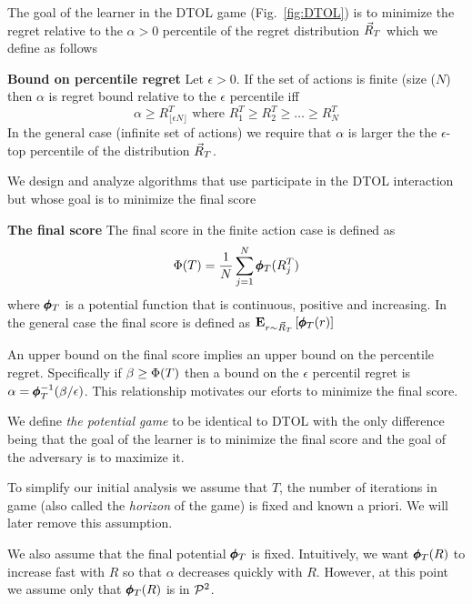\documentclass{article}[12pt]
\begin{document}
The goal of the learner in the DTOL game (Fig.~\ref{fig:DTOL}) is to
minimize the regret relative to the $\alpha>0$ percentile of the
regret distribution $\vec{R}_{T}$ which we define as follows
\begin{definition}{\bf Bound on percentile regret} Let $\epsilon>0$.
  If the set of actions is finite (size ($N$) then
  $\alpha$ is regret bound relative to the $\epsilon$ percentile  iff
  \begin{equation} \label{eqn:percentile-bound}
    \alpha\geq R_{\lfloor \epsilon N\rfloor}^T \mbox{ where } R^T_1 \geq R^T_2 \geq \ldots \geq R^T_N
  \end{equation}
  In the general case (infinite set of actions) we require that
  $\alpha$ is larger the the $\epsilon$-top percentile of the
  distribution $\vec{R}_{T}$.
\end{definition}

We design and analyze algorithms that use participate in the DTOL
interaction but whose goal is to minimize the final score
\begin{definition}{\bf The final score} \label{def:averagePotential}
  The final score in the finite action case is defined as
  \begin{equation} \label{eqn:potential-bound}
    \Phi(T) = \frac{1}{N} \sum_{j=1}^N \pmb{\phi}_{T}(R^T_j)
  \end{equation}
  where $\pmb{\phi}_{T}$ is a potential function that is
  continuous, positive and increasing.
  In the general case the final score is defined as ${\bf E}_{r \sim \vec{R}_{T}}\left[ \pmb{\phi}_{T}(r) \right]$
\end{definition}

An upper bound on the final score implies an upper bound on the
percentile regret. Specifically if $\beta \geq \Phi(T)$ then a bound
on the $\epsilon$ percentil regret is
$\alpha= \pmb{\phi}_{T}^{-1}(\beta/\epsilon)$.  This relationship
motivates our eforts to minimize the final score.

We define {\em the potential game} to be identical to DTOL with the
only difference being that the goal of the learner is to minimize the
final score and the goal of the adversary is to maximize it.

To simplify our initial analysis we assume that $T$, the number of
iterations in game (also called the {\em horizon} of the game) is
fixed and known a priori.  We will later remove this assumption.

We also assume that the final potential $\pmb{\phi}_{T}$ is
fixed. Intuitively, we want $\pmb{\phi}_{T}(R)$ to increase fast with $R$
so that $\alpha$ decreases quickly with $R$. However, at this point we
assume only that $\pmb{\phi}_{T}(R)$ is in ${\cal P}^{2}$.
\end{document}
